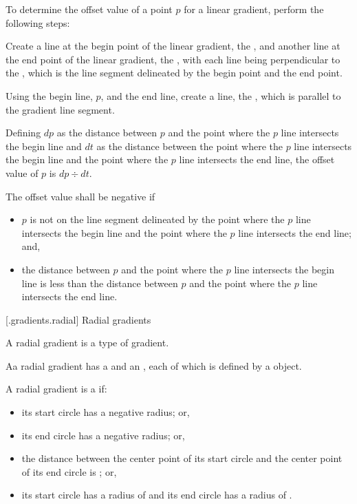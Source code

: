 \pnum
To determine the offset value of a point $p$ for a linear gradient, perform the following steps:
\begin{enumeratea}
\item Create a line at the begin point of the linear gradient, the , and another line at the end point of the linear gradient, the , with each line being perpendicular to the , which is the line segment delineated by the begin point and the end point.

\item Using the begin line, $p$, and the end line, create a line, the , which is parallel to the gradient line segment.

\item Defining $dp$ as the distance between $p$ and the point where the $p$ line intersects the begin line and $dt$ as the distance between the point where the $p$ line intersects the begin line and the point where the $p$ line intersects the end line, the offset value of $p$ is $dp \div dt$.

\item The offset value shall be negative if
\begin{itemize}
\item $p$ is not on the line segment delineated by the point where the $p$ line intersects the begin line and the point where the $p$ line intersects the end line; and,

\item the distance between $p$ and the point where the $p$ line intersects the begin line is less than the distance between $p$ and the point where the $p$ line intersects the end line.
\end{itemize}
\end{enumeratea}

 [\iotwod.gradients.radial] {Radial gradients}

\pnum
A radial gradient is a type of gradient.

\pnum
Aa radial gradient has a  and an , each of which is defined by a  object.

\pnum
A radial gradient is a  if:
\begin{itemize}
\item its start circle has a negative radius; or,
\item its end circle has a negative radius; or,
\item the distance between the center point of its start circle and the center point of its end circle is ; or,
\item its start circle has a radius of  and its end circle has a radius of .
\end{itemize}

